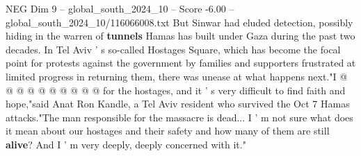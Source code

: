 \begin{textsample}{NEG Dim 9 – global\_south\_2024\_10 – Score -6.00 – global\_south\_2024\_10/116066008.txt}
But Sinwar had eluded detection, possibly hiding in the warren of \textbf{tunnels} Hamas has built under Gaza during the past two decades.
In Tel Aviv ' s so-called Hostages Square, which has become the focal point for protests against the government by families and supporters frustrated at limited progress in returning them, there was unease at what happens next."I @ @ @ @ @ @ @ @ @ @ for the hostages, and it ' s very difficult to find faith and hope,"said Anat Ron Kandle, a Tel Aviv resident who survived the Oct 7 Hamas attacks."The man responsible for the massacre is dead...
I ' m not sure what does it mean about our hostages and their safety and how many of them are still \textbf{alive}?
And I ' m very deeply, deeply concerned with it."

\end{textsample}
